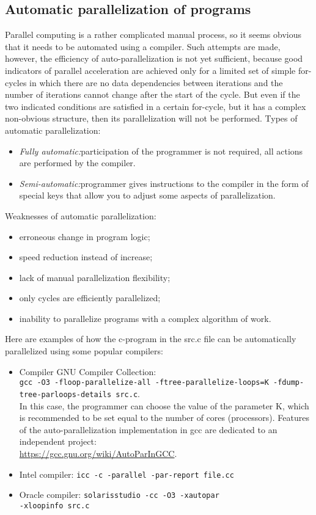 { %
	\subsection{Automatic parallelization of programs}
	\par Parallel computing is a rather complicated manual process, so it seems obvious that it needs to be automated using a compiler. Such attempts are made, however, the efficiency of auto-parallelization is not yet sufficient, because good indicators of parallel acceleration are achieved only for a limited set of simple for-cycles in which there are no data dependencies between iterations and the number of iterations cannot change after the start of the cycle. But even if the two indicated conditions are satisfied in a certain for-cycle, but it has a complex non-obvious structure, then its parallelization will not be performed. Types of automatic parallelization:
	\begin{itemize}
		\item\textit{Fully automatic:}\quad participation of the programmer is not required, all actions are performed by the compiler.
		\item\textit{Semi-automatic:}\quad programmer gives instructions to the compiler in the form of special keys that allow you to adjust some aspects of parallelization.
	\end{itemize}
	\par Weaknesses of automatic parallelization:
	\begin{itemize}
		\item erroneous change in program logic;
		\item speed reduction instead of increase;
		\item lack of manual parallelization flexibility;
		\item only cycles are efficiently parallelized;
		\item inability to parallelize programs with a complex algorithm of work.
	\end{itemize}
	\par Here are examples of how the c-program in the src.c file can be automatically parallelized using some popular compilers:
	\begin{itemize}
		\item Compiler GNU Compiler Collection:	 \\
\texttt{gcc -O3 -floop-parallelize-all -ftree-parallelize-loops=K -fdump-tree-parloops-details src.c}. \\ In this case, the programmer can choose the value of the parameter K, which is recommended to be set equal to the number of cores (processors). Features of the auto-parallelization implementation in gcc are dedicated to an independent project:\\ \url{https://gcc.gnu.org/wiki/AutoParInGCC}. 
		\item Intel compiler:	 
\texttt{icc -c -parallel -par-report file.cc}
		\item Oracle compiler:	 
\texttt{solarisstudio -cc -O3 -xautopar \\-xloopinfo src.c}
	\end{itemize}
}